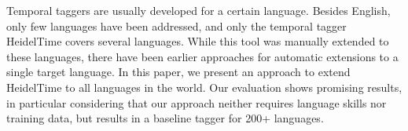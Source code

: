 Temporal taggers are usually developed for a certain language. Besides English, only few languages have been addressed, and only the temporal tagger HeidelTime covers several languages. While this tool was manually extended to these languages, there have been earlier approaches for automatic extensions to a single target language. In this paper, we present an approach to extend HeidelTime to all languages in the world. Our evaluation shows promising results, in particular considering that our approach neither requires language skills nor training data, but results in a baseline tagger for 200+ languages.
